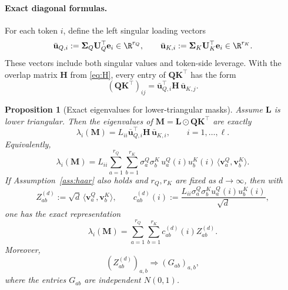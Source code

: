 \documentclass{article}
\newcommand{\weak}{\Rightarrow}
\newcommand{\hadamard}{\mathbin{\odot}}
\newcommand{\bM}{\mathbf{M}}
\newcommand{\bL}{\mathbf{L}}
\newcommand{\bQ}{\mathbf{Q}}
\newcommand{\bK}{\mathbf{K}}
\newcommand{\bU}{\mathbf{U}}
\newcommand{\be}{\mathbf{e}}
\newcommand{\bu}{\mathbf{u}}
\newcommand{\bv}{\mathbf{v}}
\newcommand{\bH}{\mathbf{H}}
\newcommand{\bSigma}{\boldsymbol{\Sigma}}
\newtheorem{proposition}[theorem]{Proposition}
\theoremstyle{definition}
\theoremstyle{remark}
\begin{document}
\paragraph{Exact diagonal formulas.}
For each token $i$, define the left singular loading vectors
\begin{equation}
    \bar{\bu}_{Q,i}
    :=
    \bSigma_Q\bU_Q^\top\be_i\in\R^{r_Q},
    \qquad
    \bar{\bu}_{K,i}
    :=
    \bSigma_K\bU_K^\top\be_i\in\R^{r_K}.
    \label{eq:bar-loadings}
\end{equation}
These vectors include both singular values and token-side leverage.  With the
overlap matrix $\bH$ from \eqref{eq:H}, every entry of $\bQ\bK^\top$ has the form
\begin{equation}
    (\bQ\bK^\top)_{ij}
    =
    \bar{\bu}_{Q,i}^{\top}\bH\,\bar{\bu}_{K,j}.
    \label{eq:entry-form}
\end{equation}

\begin{proposition}[Exact eigenvalues for lower-triangular masks]
Assume $\bL$ is lower triangular.  Then the eigenvalues of
$\bM=\bL\hadamard\bQ\bK^\top$ are exactly
\begin{equation}
    \lambda_i(\bM)
    =
    L_{ii}\bar{\bu}_{Q,i}^{\top}\bH\,\bar{\bu}_{K,i},
    \qquad i=1,\ldots,\ell.
    \label{eq:eigenvalues-exact}
\end{equation}
Equivalently,
\begin{equation}
    \lambda_i(\bM)
    =
    L_{ii}
    \sum_{a=1}^{r_Q}\sum_{b=1}^{r_K}
    \sigma^Q_a\sigma^K_b\,
    u^Q_a(i)u^K_b(i)\,
    \langle\bv^Q_a,\bv^K_b\rangle.
    \label{eq:eigenvalue-expansion}
\end{equation}
If Assumption~\ref{ass:haar} also holds and $r_Q,r_K$ are fixed as
$d\to\infty$, then with
\[
    Z_{ab}^{(d)}
    :=
    \sqrt d\,\langle\bv^Q_a,\bv^K_b\rangle,
    \qquad
    c_{ab}^{(d)}(i)
    :=
    \frac{L_{ii}\sigma^Q_a\sigma^K_bu^Q_a(i)u^K_b(i)}{\sqrt d},
\]
one has the exact representation
\begin{equation}
    \lambda_i(\bM)
    =
    \sum_{a=1}^{r_Q}\sum_{b=1}^{r_K}
    c_{ab}^{(d)}(i)Z_{ab}^{(d)}.
    \label{eq:fixed-rank-exact-characterization}
\end{equation}
Moreover,
\[
    (Z_{ab}^{(d)})_{a,b}\weak (G_{ab})_{a,b},
\]
where the entries $G_{ab}$ are independent $N(0,1)$.
\label{prop:exact-lower-triangular-eigenvalues}
\end{proposition}
\end{document}
